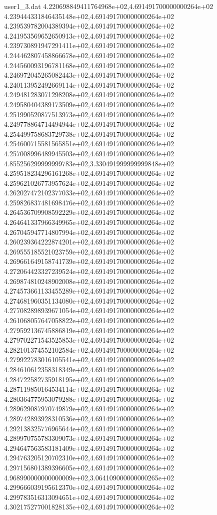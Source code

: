 \begin{filecontents}{user1_3.dat}
4.220698849411764968e+02,4.691491700000000264e+02
4.239444331846435148e+02,4.691491700000000264e+02
4.239539782004389394e+02,4.691491700000000264e+02
4.241953569652650913e+02,4.691491700000000264e+02
4.239730891947291411e+02,4.691491700000000264e+02
4.244462807458866678e+02,4.691491700000000264e+02
4.244560093196781168e+02,4.691491700000000264e+02
4.246972045265082443e+02,4.691491700000000264e+02
4.240113952492669114e+02,4.691491700000000264e+02
4.249481283071298208e+02,4.691491700000000264e+02
4.249580404389173509e+02,4.691491700000000264e+02
4.251990520877513973e+02,4.691491700000000264e+02
4.249778864714494944e+02,4.691491700000000264e+02
4.254499758683729738e+02,4.691491700000000264e+02
4.254600715581565851e+02,4.691491700000000264e+02
4.257008996489945503e+02,4.691491700000000264e+02
4.855256299999999783e+02,3.330491999999999848e+02
4.259518234296161268e+02,4.691491700000000264e+02
4.259621026773957624e+02,4.691491700000000264e+02
4.262027472102377033e+02,4.691491700000000264e+02
4.259826837481698476e+02,4.691491700000000264e+02
4.264536709908592229e+02,4.691491700000000264e+02
4.264641337966349965e+02,4.691491700000000264e+02
4.267045947714807994e+02,4.691491700000000264e+02
4.260239364222874201e+02,4.691491700000000264e+02
4.269555185521023759e+02,4.691491700000000264e+02
4.269661649158741739e+02,4.691491700000000264e+02
4.272064423327239524e+02,4.691491700000000264e+02
4.269874810248902008e+02,4.691491700000000264e+02
4.274573661133455289e+02,4.691491700000000264e+02
4.274681960351134080e+02,4.691491700000000264e+02
4.277082898939671054e+02,4.691491700000000264e+02
4.261068057647058822e+02,4.691491700000000264e+02
4.279592136745886819e+02,4.691491700000000264e+02
4.279702271543525853e+02,4.691491700000000264e+02
4.282101374552102584e+02,4.691491700000000264e+02
4.279922783016105541e+02,4.691491700000000264e+02
4.284610612358318349e+02,4.691491700000000264e+02
4.284722582735918195e+02,4.691491700000000264e+02
4.287119850164534114e+02,4.691491700000000264e+02
4.280364775953079288e+02,4.691491700000000264e+02
4.289629087970749879e+02,4.691491700000000264e+02
4.289742893928310536e+02,4.691491700000000264e+02
4.292138325776965644e+02,4.691491700000000264e+02
4.289970755783309073e+02,4.691491700000000264e+02
4.294647563583181409e+02,4.691491700000000264e+02
4.294763205120702310e+02,4.691491700000000264e+02
4.297156801389396605e+02,4.691491700000000264e+02
4.968990000000000009e+02,3.064109000000000265e+02
4.299666039195612370e+02,4.691491700000000264e+02
4.299783516313094651e+02,4.691491700000000264e+02
4.302175277001828135e+02,4.691491700000000264e+02

\end{filecontents}
